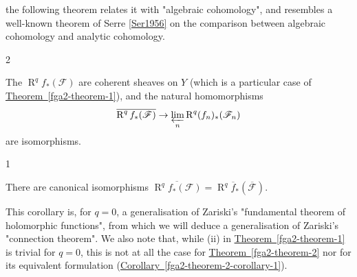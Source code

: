   the following theorem relates it with "algebraic cohomology", and resembles a well-known theorem of Serre \hyperref[Ser1956]{[Ser1956]} on the comparison between algebraic cohomology and analytic cohomology.\begin{theorem}{2}\label{fga2-theorem-2}\skipsinglepar\par{}The \(\operatorname {R}^q f_*(\mathscr {F})\) are coherent sheaves on \(Y\) (which is a particular case of \hyperref[fga2-theorem-1]{Theorem~\ref*{fga2-theorem-1}}), and the natural homomorphisms
    \[       \overline {\operatorname {R}^q f_*(\mathscr {F})}       \to  \varprojlim _n \operatorname {R}^q (f_n)_*(\mathscr {F}_n)     \]
    are isomorphisms.\end{theorem}\begin{corollary}{1}\label{fga2-theorem-2-corollary-1}\skipsinglepar\par{}There are canonical isomorphisms \(\overline {\operatorname {R}^q f_*(\mathscr {F})} = \operatorname {R}^q\overline {f}_*(\overline {\mathscr {F}})\).\end{corollary}\par{}This corollary is, for \(q=0\), a generalisation of Zariski's "fundamental theorem of holomorphic functions", from which we will deduce a generalisation of Zariski's "connection theorem".
  We also note that, while (ii) in \hyperref[fga2-theorem-1]{Theorem~\ref*{fga2-theorem-1}} is trivial for \(q=0\), this is not at all the case for \hyperref[fga2-theorem-2]{Theorem~\ref*{fga2-theorem-2}} nor for its equivalent formulation (\hyperref[fga2-theorem-2-corollary-1]{Corollary~\ref*{fga2-theorem-2-corollary-1}}).
